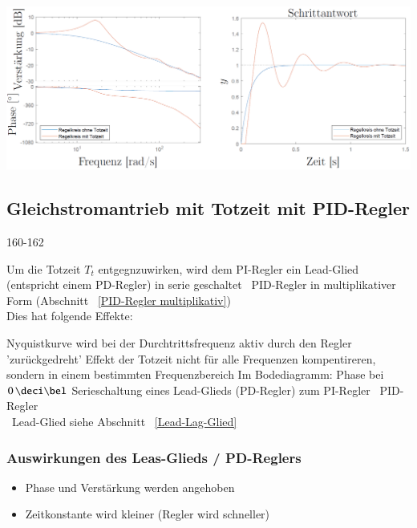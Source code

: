 \includegraphics[width=\columnwidth]{images/gleichstromantrieb_pi-regler_totzeit_step_response.png}


\subsection{Gleichstromantrieb mit Totzeit mit PID-Regler}{160-162}

Um die Totzeit $T_t$ entgegnzuwirken, wird dem PI-Regler ein Lead-Glied (entspricht einem PD-Regler) in serie geschaltet 
\textrightarrow\ PID-Regler in multiplikativer Form (Abschnitt ~\ref{PID-Regler multiplikativ}) \\

Dies hat folgende Effekte:

\begin{outline}
    \1 Nyquistkurve wird bei der Durchtrittsfrequenz aktiv durch den Regler 'zurückgedreht' 
        \2 Effekt der Totzeit nicht für alle Frequenzen kompentireren, sondern in einem bestimmten Frequenzbereich
        \2 Im Bodediagramm: Phase bei $0 \, \deci \bel$ 
    \1 Serieschaltung eines Lead-Glieds (PD-Regler) zum PI-Regler \textrightarrow\ PID-Regler \\
        \textrightarrow\ Lead-Glied siehe Abschnitt ~\ref{Lead-Lag-Glied}
\end{outline}


\subsubsection{Auswirkungen des Leas-Glieds / PD-Reglers}

\begin{itemize}
    \item Phase und Verstärkung werden angehoben
    \item Zeitkonstante wird kleiner (Regler wird schneller)
\end{itemize}


